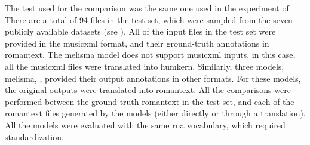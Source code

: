 
The test used for the comparison was the same one used in
the experiment of .
There are a total of 94 files in the test set, which were
sampled from the seven publicly available datasets (see
). All of the input files
in the test set were provided in the \gls{musicxml} format,
and their ground-truth annotations in \gls{romantext}. The
\gls{melisma} model does not support \gls{musicxml} inputs,
in this case, all the \gls{musicxml} files were translated
into \gls{humkern}. Similarly, three models, \gls{melisma},
\textcite{chen2021attend, mcleod2021modular}, provided their
output annotations in other formats. For these models, the
original outputs were translated into \gls{romantext}. All
the comparisons were performed between the ground-truth
\gls{romantext} in the test set, and each of the
\gls{romantext} files generated by the models (either
directly or through a translation). All the models were
evaluated with the same \gls{rna} vocabulary, which required
standardization.


